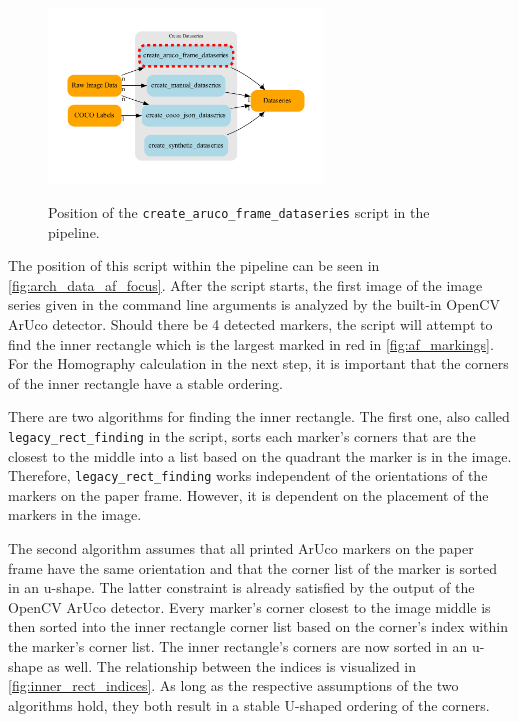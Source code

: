 \documentclass[10pt]{book}
\newcommand{\figureref}[1]{\autoref{#1}}
\begin{document}
\begin{figure}
  \caption{Position of the \texttt{create\_aruco\_frame\_dataseries} script in the pipeline.}
  \includegraphics[width=0.65\textwidth]{graph/arch_data_af_focus}
  \label{fig:arch_data_af_focus}
\end{figure}

The position of this script within the pipeline can be seen in \figureref{fig:arch_data_af_focus}. After the script starts, the first image of the image series given in the command line arguments is analyzed by the built-in \ac{OpenCV} \ac{ArUco} detector. Should there be 4 detected markers, the script will attempt to find the inner rectangle which is the largest marked in red in \figureref{fig:af_markings}. For the Homography calculation in the next step, it is important that the corners of the inner rectangle have a stable ordering.

There are two algorithms for finding the inner rectangle. The first one, also called \texttt{legacy\_rect\_finding} in the script, sorts each marker's corners that are the closest to the middle into a list based on the quadrant the marker is in the image. Therefore, \texttt{legacy\_rect\_finding} works independent of the orientations of the markers on the paper frame. However, it is dependent on the placement of the markers in the image. 

The second algorithm assumes that all printed \ac{ArUco} markers on the paper frame have the same orientation and that the corner list of the marker is sorted in an u-shape. The latter constraint is already satisfied by the output of the \ac{OpenCV} \ac{ArUco} detector. Every marker's corner closest to the image middle is then sorted into the inner rectangle corner list based on the corner's index within the marker's corner list. %
The inner rectangle's corners are now sorted in an u-shape as well. The relationship between the indices is visualized in \figureref{fig:inner_rect_indices}. As long as the respective assumptions of the two algorithms hold, they both result in a stable U-shaped ordering of the corners.
\end{document}
